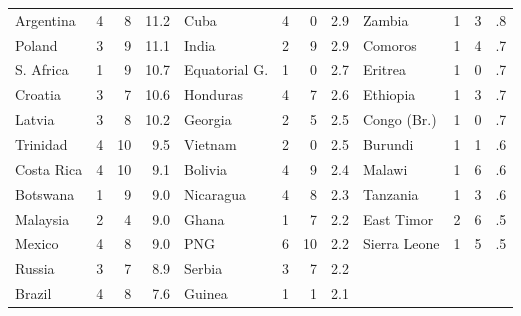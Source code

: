 \begin{table}
\begin{tabular}{|lrrr|lrrr|lrrr|}
Argentina     & 4 &  8 &11.2 &Cuba          & 4 &  0 & 2.9&Zambia       &1& 3&   .8\\
Poland        & 3 &  9 &11.1 &India         & 2 &  9 & 2.9&Comoros      &1& 4&   .7\\
S. Africa     & 1 &  9 &10.7 &Equatorial G. & 1 &  0 & 2.7&Eritrea      &1& 0&   .7\\
Croatia       & 3 &  7 &10.6 &Honduras      & 4 &  7 & 2.6&Ethiopia     &1& 3&   .7\\
Latvia        & 3 &  8 &10.2 &Georgia       & 2 &  5 & 2.5&Congo (Br.)  &1& 0&   .7\\
Trinidad      & 4 & 10 & 9.5 &Vietnam       & 2 &  0 & 2.5&Burundi      &1& 1&   .6\\
Costa Rica    & 4 & 10 & 9.1 &Bolivia       & 4 &  9 & 2.4&Malawi       &1& 6&   .6\\
Botswana      & 1 &  9 & 9.0 &Nicaragua     & 4 &  8 & 2.3&Tanzania     &1& 3&   .6\\
Malaysia      & 2 &  4 & 9.0 &Ghana         & 1 &  7 & 2.2&East Timor   &2& 6&   .5\\
Mexico        & 4 &  8 & 9.0 &PNG           & 6 & 10 & 2.2&Sierra Leone &1& 5&   .5\\
Russia        & 3 &  7 & 8.9 &Serbia        & 3 &  7 & 2.2&             & &  &     \\
Brazil        & 4 &  8 & 7.6 &Guinea        & 1 &  1 & 2.1&& &  &     \\
\hline
\end{tabular}
\end{table}
